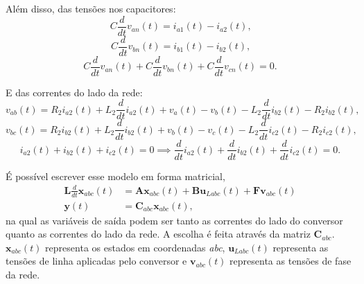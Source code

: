     Além disso, das tensões nos capacitores:
    \begin{equation}
        C \frac{d}{dt} v_{an}(t) = i_{a1}(t) - i_{a2}(t) \text{,}
    \end{equation}
    \begin{equation}
        C \frac{d}{dt} v_{bn}(t) = i_{b1}(t) - i_{b2}(t) \text{,}
    \end{equation}
    \begin{equation}
        C \frac{d}{dt} v_{an}(t) + C \frac{d}{dt} v_{bn}(t) +
            C \frac{d}{dt} v_{cn}(t) = 0 \text{.}
    \end{equation}

    E das correntes do lado da rede:
    \begin{equation}
        v_{ab}(t) = R_2 i_{a2}(t) + L_2 \frac{d}{dt} i_{a2}(t) + v_a(t) - v_b(t)
            - L_2 \frac{d}{dt} i_{b2}(t) - R_2 i_{b2}(t) \text{,}
    \end{equation}
    \begin{equation}
        v_{bc}(t) = R_2 i_{b2}(t) + L_2 \frac{d}{dt} i_{b2}(t) + v_b(t) - v_c(t)
            - L_2 \frac{d}{dt} i_{c2}(t) - R_2 i_{c2}(t) \text{,}
    \end{equation}
    \begin{equation}
        i_{a2}(t) + i_{b2}(t) + i_{c2}(t) = 0 \implies \frac{d}{dt} i_{a2}(t) +
            \frac{d}{dt} i_{b2}(t) + \frac{d}{dt} i_{c2}(t) = 0 \text{.}
    \end{equation}

    É possível escrever esse modelo em forma matricial,
    \begin{equation}
        \begin{split}
            \mathbf{L} \frac{d}{dt} \mathbf{x}_{abc}(t) & = \mathbf{Ax}_{abc}(t) +
                \mathbf{Bu}_{Labc}(t) + \mathbf{Fv}_{abc}(t) \\
            \mathbf{y}(t) & = \mathbf{C}_{abc} \mathbf{x}_{abc}(t) \text{,}
        \end{split}
    \end{equation}
    na qual as variáveis de saída podem ser tanto as correntes do lado do conversor
    quanto as correntes do lado da rede. A escolha é feita através da matriz
    $\mathbf{C}_{abc}$. $\mathbf{x}_{abc}(t)$ representa os estados em coordenadas
    \emph{abc}, $\mathbf{u}_{Labc}(t)$ representa as tensões de linha aplicadas pelo
    conversor e $\mathbf{v}_{abc}(t)$ representa as tensões de fase da rede.

